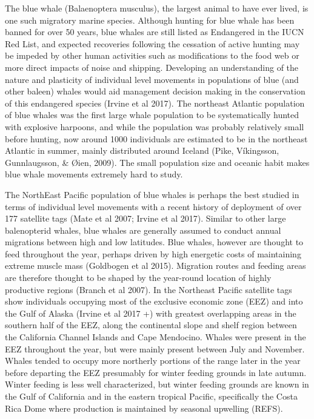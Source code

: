 \documentclass[a4paper,12pt]{article}
\begin{document}
The blue whale (Balaenoptera musculus), the largest animal to have ever lived, is one such migratory marine species. Although hunting for blue whale has been banned for over 50 years, blue whales are still listed as Endangered in the IUCN Red List, and expected recoveries following the cessation of active hunting may be impeded by other human activities such as modifications to the food web or more direct impacts of noise and shipping.   Developing an understanding of the nature and plasticity of individual level movements in populations of blue (and other baleen) whales would aid management decision making in the conservation of this endangered species (Irvine et al 2017).  The northeast Atlantic population of blue whales was the first large whale population to be systematically hunted with explosive harpoons, and while the population was probably relatively small before hunting, now around 1000 individuals are estimated to be in the northeast Atlantic in summer, mainly distributed around Iceland (Pike, Víkingsson, Gunnlaugsson, & Øien, 2009). The small population size and oceanic habit makes blue whale movements extremely hard to study. 

The NorthEast Pacific population of blue whales is perhaps the best studied in terms of individual level movements with a recent history of deployment of over 177 satellite tags (Mate et al 2007; Irvine et al 2017).   Similar to other large balenopterid whales, blue whales are generally assumed to conduct annual migrations between high and low latitudes. Blue whales, however are thought to feed throughout the year, perhaps driven by high energetic costs of maintaining extreme muscle mass (Goldbogen et al 2015). Migration routes and feeding areas are therefore thought to be shaped by the year-round location of highly productive regions (Branch et al 2007). In the Northeast Pacific satellite tags show individuals occupying most of the exclusive economic zone (EEZ) and into the Gulf of Alaska (Irvine et al 2017 +) with greatest overlapping areas in the southern half of the EEZ, along the continental slope and shelf region between the California Channel Islands and Cape Mendocino. Whales were present in the EEZ throughout the year, but were mainly present between July and November. Whales tended to occupy more northerly portions of the range later in the year before departing the EEZ presumably for winter feeding grounds in late autumn. Winter feeding is less well characterized, but winter feeding grounds are known in the Gulf of California and in the eastern tropical Pacific, specifically the Costa Rica Dome  where production is maintained by seasonal upwelling (REFS).
\end{document}

